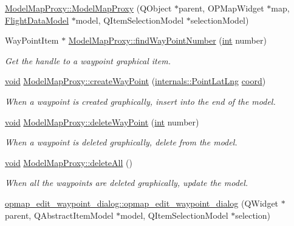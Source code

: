 \begin{DoxyCompactItemize}
\item 
\hyperlink{group___o_p_map_plugin_gaa86a0afe448c45b8ecffde73dff2be16}{Model\-Map\-Proxy\-::\-Model\-Map\-Proxy} (Q\-Object $\ast$parent, O\-P\-Map\-Widget $\ast$map, \hyperlink{class_flight_data_model}{Flight\-Data\-Model} $\ast$model, Q\-Item\-Selection\-Model $\ast$selection\-Model)
\item 
Way\-Point\-Item $\ast$ \hyperlink{group___o_p_map_plugin_gabc5719db39d81801af2bce5a5dd3eee9}{Model\-Map\-Proxy\-::find\-Way\-Point\-Number} (\hyperlink{ioapi_8h_a787fa3cf048117ba7123753c1e74fcd6}{int} number)
\begin{DoxyCompactList}\small\item\em Get the handle to a waypoint graphical item. \end{DoxyCompactList}\item 
\hyperlink{group___u_a_v_objects_plugin_ga444cf2ff3f0ecbe028adce838d373f5c}{void} \hyperlink{group___o_p_map_plugin_ga4e68125d7b19aa3adf055e50bea8afdf}{Model\-Map\-Proxy\-::create\-Way\-Point} (\hyperlink{structinternals_1_1_point_lat_lng}{internals\-::\-Point\-Lat\-Lng} \hyperlink{glext_8h_a4ad6f000813afde2b5727cbfdddc75be}{coord})
\begin{DoxyCompactList}\small\item\em When a waypoint is created graphically, insert into the end of the model. \end{DoxyCompactList}\item 
\hyperlink{group___u_a_v_objects_plugin_ga444cf2ff3f0ecbe028adce838d373f5c}{void} \hyperlink{group___o_p_map_plugin_ga6e67b9c6c661db0b0c02119c6372c5b7}{Model\-Map\-Proxy\-::delete\-Way\-Point} (\hyperlink{ioapi_8h_a787fa3cf048117ba7123753c1e74fcd6}{int} number)
\begin{DoxyCompactList}\small\item\em When a waypoint is deleted graphically, delete from the model. \end{DoxyCompactList}\item 
\hyperlink{group___u_a_v_objects_plugin_ga444cf2ff3f0ecbe028adce838d373f5c}{void} \hyperlink{group___o_p_map_plugin_gaf33e33d2457fd1ebc593907ffd3c0167}{Model\-Map\-Proxy\-::delete\-All} ()
\begin{DoxyCompactList}\small\item\em When all the waypoints are deleted graphically, update the model. \end{DoxyCompactList}\item 
\hyperlink{group___o_p_map_plugin_ga0681c04758995d1dca076a79d6c7ebb8}{opmap\-\_\-edit\-\_\-waypoint\-\_\-dialog\-::opmap\-\_\-edit\-\_\-waypoint\-\_\-dialog} (Q\-Widget $\ast$parent, Q\-Abstract\-Item\-Model $\ast$model, Q\-Item\-Selection\-Model $\ast$selection)

\end{DoxyCompactItemize}
